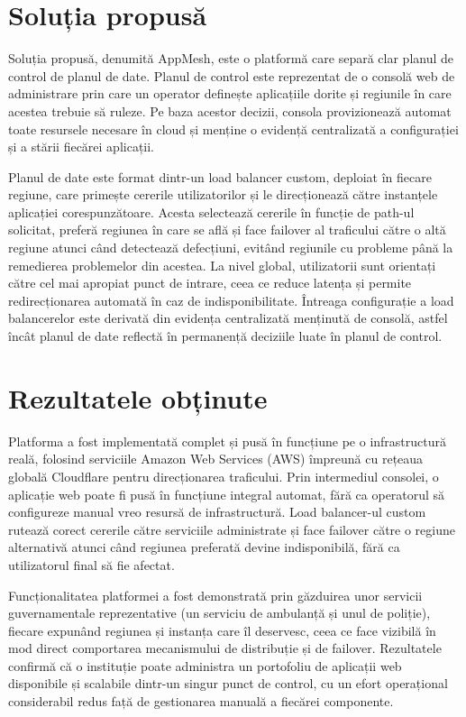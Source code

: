 \documentclass[12pt,a4paper]{report}
\begin{document}
\section{Soluția propusă}
Soluția propusă, denumită AppMesh, este o platformă care separă clar planul de control de planul de date. Planul de control este reprezentat de o consolă web de administrare prin care un operator definește aplicațiile dorite și regiunile în care acestea trebuie să ruleze. Pe baza acestor decizii, consola provizionează automat toate resursele necesare în cloud și menține o evidență centralizată a configurației și a stării fiecărei aplicații.

Planul de date este format dintr-un load balancer custom, deploiat în fiecare regiune, care primește cererile utilizatorilor și le direcționează către instanțele aplicației corespunzătoare. Acesta selectează cererile în funcție de path-ul solicitat, preferă regiunea în care se află și face failover al traficului către o altă regiune atunci când detectează defecțiuni, evitând regiunile cu probleme până la remedierea problemelor din acestea. La nivel global, utilizatorii sunt orientați către cel mai apropiat punct de intrare, ceea ce reduce latența și permite redirecționarea automată în caz de indisponibilitate. Întreaga configurație a load balancerelor este derivată din evidența centralizată menținută de consolă, astfel încât planul de date reflectă în permanență deciziile luate în planul de control.

\section{Rezultatele obținute}
Platforma a fost implementată complet și pusă în funcțiune pe o infrastructură reală, folosind serviciile Amazon Web Services (AWS) împreună cu rețeaua globală Cloudflare pentru direcționarea traficului. Prin intermediul consolei, o aplicație web poate fi pusă în funcțiune integral automat, fără ca operatorul să configureze manual vreo resursă de infrastructură. Load balancer-ul custom rutează corect cererile către serviciile administrate și face failover către o regiune alternativă atunci când regiunea preferată devine indisponibilă, fără ca utilizatorul final să fie afectat.

Funcționalitatea platformei a fost demonstrată prin găzduirea unor servicii guvernamentale reprezentative (un serviciu de ambulanță și unul de poliție), fiecare expunând regiunea și instanța care îl deservesc, ceea ce face vizibilă în mod direct comportarea mecanismului de distribuție și de failover. Rezultatele confirmă că o instituție poate administra un portofoliu de aplicații web disponibile și scalabile dintr-un singur punct de control, cu un efort operațional considerabil redus față de gestionarea manuală a fiecărei componente.
\end{document}
